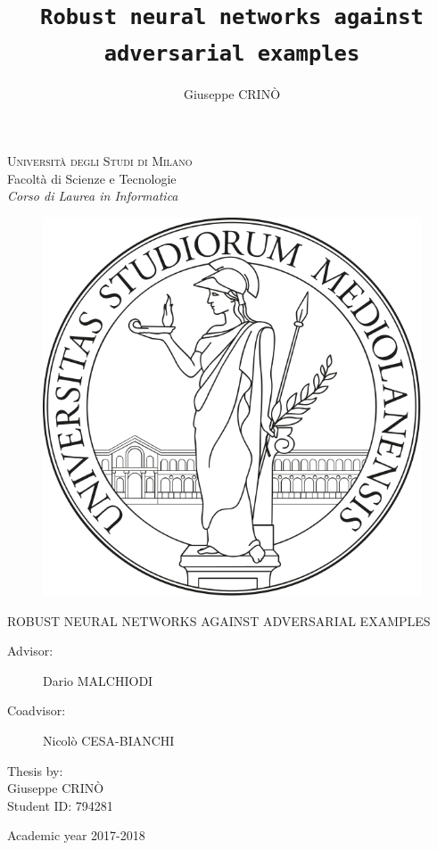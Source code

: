 \documentclass{mimosis}
\title{\texttt{Robust neural networks against adversarial examples}}
\author{Giuseppe CRIN\`O}
\begin{document}
\frontmatter
  \begin{titlepage}
  \begin{center}
      \Large
      \textsc{Universit\`a degli Studi di Milano} \\
      Facolt\`a di Scienze e Tecnologie \\
      \emph{Corso di Laurea in Informatica}
  \end{center}
  \begin{figure}[H]
    \centering
    \includegraphics[width=0.5\linewidth]{logo-unimi.png}
  \end{figure}
	\begin{center}
		\Large ROBUST NEURAL NETWORKS AGAINST ADVERSARIAL EXAMPLES
	\end{center}
	\vfill
  \begin{description}
  \item[Advisor:] Dario MALCHIODI
  \item[Coadvisor:] Nicol\`o CESA-BIANCHI
  \end{description}
        \null\hfill
        \parbox{3in} {
          Thesis by: \\
          \expandafter{Giuseppe CRIN\`O} \\ 
          Student ID: 794281
        }
        \vfill
	\begin{center}
    \Large Academic year 2017-2018
  \end{center}
  \end{titlepage}

  \newpage
  \null
  \thispagestyle{empty}
  \newpage

  \tableofcontents

\mainmatter

  
  
  
  
  

\backmatter

  \printbibliography
\end{document}
